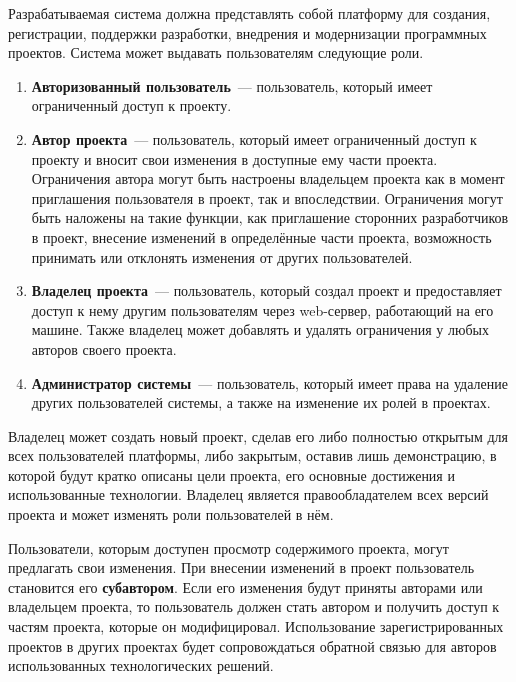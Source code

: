 \documentclass{bmstu}
\begin{document}
  Разрабатываемая система должна представлять собой платформу для
  создания, регистрации, поддержки разработки, внедрения и
  модернизации программных проектов.
  Система может выдавать пользователям следующие роли.
  \begin{enumerate}[label*=\arabic*.]
    \item \textbf{Авторизованный пользователь}~--- пользователь,
      который имеет ограниченный доступ к проекту.
    \item \textbf{Автор проекта}~--- пользователь, который имеет
      ограниченный доступ к проекту и вносит свои изменения в
      доступные ему части проекта. Ограничения автора могут быть
      настроены владельцем проекта как в момент приглашения
      пользователя в проект, так и впоследствии. Ограничения могут
      быть наложены на такие функции, как приглашение сторонних
      разработчиков в проект, внесение изменений в определённые части
      проекта, возможность принимать или отклонять изменения от других
      пользователей.
    \item \textbf{Владелец проекта}~--- пользователь, который создал
      проект и предоставляет доступ к нему другим пользователям через
      web-сервер, работающий на его машине. Также владелец может
      добавлять и удалять ограничения у любых авторов своего проекта.
    \item \textbf{Администратор системы}~--- пользователь, который
      имеет права на удаление других пользователей системы, а также на
      изменение их ролей в проектах.
  \end{enumerate}

  Владелец может создать новый проект, сделав его либо полностью
  открытым для всех пользователей платформы, либо закрытым, оставив
  лишь демонстрацию, в которой будут кратко описаны цели проекта, его
  основные достижения и использованные технологии.
  Владелец является правообладателем всех версий проекта и может
  изменять роли пользователей в нём.

  Пользователи, которым доступен просмотр содержимого проекта, могут
  предлагать свои изменения.
  При внесении изменений в проект пользователь становится его
  \textbf{субавтором}.
  Если его изменения будут приняты авторами или владельцем проекта, то
  пользователь должен стать автором и получить доступ к частям
  проекта, которые он модифицировал.
  Использование зарегистрированных проектов в других проектах будет
  сопровождаться обратной связью для авторов использованных
  технологических решений.
\end{document}
